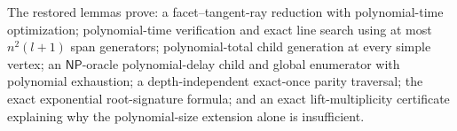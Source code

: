 The restored lemmas prove: a facet--tangent-ray reduction with polynomial-time optimization; polynomial-time verification and exact line search using at most \(n^2(l+1)\) span generators; polynomial-total child generation at every simple vertex; an \(\mathsf{NP}\)-oracle polynomial-delay child and global enumerator with polynomial exhaustion; a depth-independent exact-once parity traversal; the exact exponential root-signature formula; and an exact lift-multiplicity certificate explaining why the polynomial-size extension alone is insufficient.